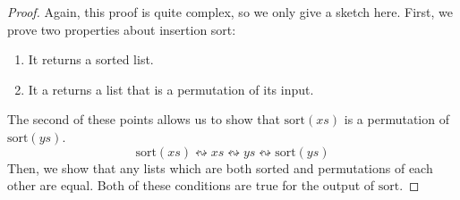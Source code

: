 \begin{proof}
  Again, this proof is quite complex, so we only give a sketch here.
  First, we prove two properties about insertion sort:
  \begin{enumerate}
    \item It returns a sorted list.
    \item It a returns a list that is a permutation of its input.
  \end{enumerate}
  The second of these points allows us to show that \(\text{sort}(\mathit{xs})\)
  is a permutation of \(\text{sort}(\mathit{ys})\).
  \begin{equation}
    \text{sort}(\mathit{xs}) \leftrightsquigarrow \mathit{xs} \leftrightsquigarrow \mathit{ys} \leftrightsquigarrow \text{sort}(\mathit{ys})
  \end{equation}
  Then, we show that any lists which are both sorted and permutations of each
  other are equal.
  Both of these conditions are true for the output of \(\text{sort}\).
\end{proof}
